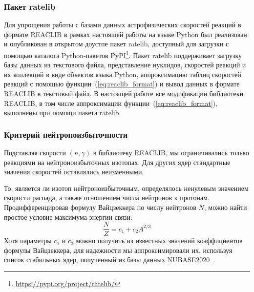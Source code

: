 \subsubsection{Пакет ratelib}
Для упрощения работы с базами данных астрофизических скоростей реакций в формате REACLIB в рамках настоящей работы на языке Python был реализован и опубликован в открытом доустпе пакет ratelib, доступный для загрузки с помощью каталога Python-пакетов PyPI\footnote{\href{https://pypi.org/project/ratelib/}{https://pypi.org/project/ratelib/}}. Пакет ratelib поддерживает загрузку базы данных из текстового файла, представление нуклидов, скоростей реакций и их коллекций в виде объектов языка Python, аппроксимацию таблиц скоростей реакций с помощью функции~(\ref{eq:reaclib_format}) и вывод данных в формате REACLIB в текстовый файл. В настоящей работе все модификации библиотеки REACLIB, в том числе аппроксимации функции~(\ref{eq:reaclib_format}), выполнены при помощи пакета ratelib.

\subsubsection{Критерий нейтроноизбыточности} \label{sec:nrich_criteria}
Подставляя скорости $(n,\gamma)$ в библиотеку REACLIB, мы ограничивались только реакциями на нейтроноизбыточных изотопах. Для других ядер стандартные значения скоростей оставлялись неизменными.

То, является ли изотоп нейтроноизбыточным, определялось ненулевым значением скорости распада, а также отношением числа нейтронов к протонам. Продифференцировав формулу Вайцзеккера по числу нейтронов $N$, можно найти простое условие максимума энергии связи:
\begin{equation}
  \displaystyle
  \frac{N}{Z} = c_1 + c_2 A^{2/3}
  \label{eq:nzratio}
\end{equation}
Хотя параметры $c_1$ и $c_2$ можно получить из известных значений коэффициентов формулы Вайцзеккера, для надежности мы аппроксимировали их, используя список стабильных ядер, полученный из базы данных NUBASE2020~\cite{kondev2021}.
